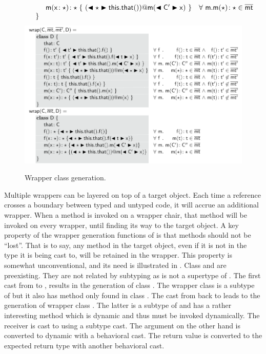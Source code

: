 \documentclass[a4paper,USenglish]{tex/lipics-v2016}
\begin{document}
\begin{figure}[!ht]
{\[\begin{array}{@{}ll@{}l@{}r@{~}c@{~}r}
\SPP   \Mdef\m\x\any\any{~\DynCall{(\BehCast\any{\Get\this\that})}\m{\BehCast\Cp\x}~}
&  \All \m  \Mtype\m\any\any \in \bmt\\
\SP \}\\
\end{array}\]
}%
  \includegraphics[width=.9\textwidth]{figures/wrapDefinition}

\hrulefill
  \caption{Wrapper class generation.}\label{wrap}
\end{figure}

Multiple wrappers can be layered on top of a target object. Each time a
reference crosses a boundary between typed and untyped code, it will accrue
an additional wrapper. When a method is invoked on a wrapper chair, that
method will be invoked on every wrapper, until finding its way to the target
object. A key property of the wrapper generation functions of 
is that methods should not be ``lost''. That is to say, any method in the
target object, even if it is not in the type it is being cast to, will be
retained in the wrapper.  This property is somewhat unconventional, and its
need is illustrated in . Class \C and \D are preexisting.  They
are not related by subtyping as \any is not a supertype of \E. The first
cast from \C to \D, results in the generation of class . The
wrapper class is a subtype of \D but it also has method \mp only found in
class \C.  The cast from  back to \C leads to the generation of
wrapper class . The latter is a subtype of \C and has a rather
interesting method \m which is dynamic and thus must be invoked dynamically.
The receiver is cast to \any using a subtype cast. The argument on the other
hand is converted to dynamic with a behavioral cast. The return value is
converted to the expected return type with another behavioral cast.
\end{document}
